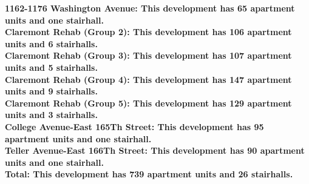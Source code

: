 \bf{1162-1176 Washington Avenue}: This development has 65 apartment units and one stairhall.\\\bf{Claremont Rehab (Group 2)}: This development has 106 apartment units and 6 stairhalls.\\\bf{Claremont Rehab (Group 3)}: This development has 107 apartment units and 5 stairhalls.\\\bf{Claremont Rehab (Group 4)}: This development has 147 apartment units and 9 stairhalls.\\\bf{Claremont Rehab (Group 5)}: This development has 129 apartment units and 3 stairhalls.\\\bf{College Avenue-East 165Th Street}: This development has 95 apartment units and one stairhall.\\\bf{Teller Avenue-East 166Th Street}: This development has 90 apartment units and one stairhall.\\\bf{Total}: This development has 739 apartment units and 26 stairhalls.\\
